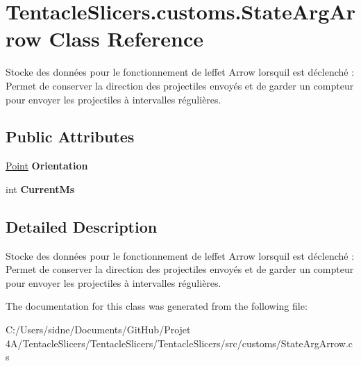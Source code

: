 \hypertarget{class_tentacle_slicers_1_1customs_1_1_state_arg_arrow}{}\section{Tentacle\+Slicers.\+customs.\+State\+Arg\+Arrow Class Reference}
\label{class_tentacle_slicers_1_1customs_1_1_state_arg_arrow}


Stocke des données pour le fonctionnement de l\textquotesingle{}effet Arrow lorsqu\textquotesingle{}il est déclenché \+: Permet de conserver la direction des projectiles envoyés et de garder un compteur pour envoyer les projectiles à intervalles régulières.  


\subsection*{Public Attributes}
\begin{DoxyCompactItemize}
\item 
\mbox{\label{class_tentacle_slicers_1_1customs_1_1_state_arg_arrow_ae76080c1215962e82e19ea59a7368cd5}} 
\hyperlink{class_tentacle_slicers_1_1general_1_1_point}{Point} {\bfseries Orientation}
\item 
\mbox{\label{class_tentacle_slicers_1_1customs_1_1_state_arg_arrow_aa3c832adafd2f2c4dea0fc779485d799}} 
int {\bfseries Current\+Ms}
\end{DoxyCompactItemize}


\subsection{Detailed Description}
Stocke des données pour le fonctionnement de l\textquotesingle{}effet Arrow lorsqu\textquotesingle{}il est déclenché \+: Permet de conserver la direction des projectiles envoyés et de garder un compteur pour envoyer les projectiles à intervalles régulières. 



The documentation for this class was generated from the following file\+:\begin{DoxyCompactItemize}
\item 
C\+:/\+Users/sidne/\+Documents/\+Git\+Hub/\+Projet 4\+A/\+Tentacle\+Slicers/\+Tentacle\+Slicers/\+Tentacle\+Slicers/src/customs/State\+Arg\+Arrow.\+cs\end{DoxyCompactItemize}
